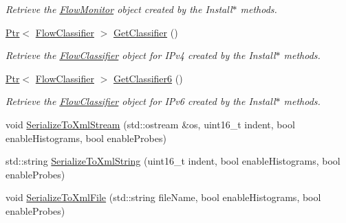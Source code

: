 \begin{DoxyCompactItemize}
\begin{DoxyCompactList}\small\item\em Retrieve the \hyperlink{classns3_1_1FlowMonitor}{Flow\+Monitor} object created by the Install$\ast$ methods. \end{DoxyCompactList}\item 
\hyperlink{classns3_1_1Ptr}{Ptr}$<$ \hyperlink{classns3_1_1FlowClassifier}{Flow\+Classifier} $>$ \hyperlink{classns3_1_1FlowMonitorHelper_a60084e694545354136fed3ce93de00ae}{Get\+Classifier} ()
\begin{DoxyCompactList}\small\item\em Retrieve the \hyperlink{classns3_1_1FlowClassifier}{Flow\+Classifier} object for I\+Pv4 created by the Install$\ast$ methods. \end{DoxyCompactList}\item 
\hyperlink{classns3_1_1Ptr}{Ptr}$<$ \hyperlink{classns3_1_1FlowClassifier}{Flow\+Classifier} $>$ \hyperlink{classns3_1_1FlowMonitorHelper_a4be2bf1ce8fc4d8e646e3bc77994f606}{Get\+Classifier6} ()
\begin{DoxyCompactList}\small\item\em Retrieve the \hyperlink{classns3_1_1FlowClassifier}{Flow\+Classifier} object for I\+Pv6 created by the Install$\ast$ methods. \end{DoxyCompactList}\item 
void \hyperlink{classns3_1_1FlowMonitorHelper_a9fe13d3552876858d3b2abc08a117f3b}{Serialize\+To\+Xml\+Stream} (std\+::ostream \&os, uint16\+\_\+t indent, bool enable\+Histograms, bool enable\+Probes)
\item 
std\+::string \hyperlink{classns3_1_1FlowMonitorHelper_a349f123606ce669102fb554fcc9dd799}{Serialize\+To\+Xml\+String} (uint16\+\_\+t indent, bool enable\+Histograms, bool enable\+Probes)
\item 
void \hyperlink{classns3_1_1FlowMonitorHelper_ad032f5b08ea5ccbb5992b5ccf56f08e8}{Serialize\+To\+Xml\+File} (std\+::string file\+Name, bool enable\+Histograms, bool enable\+Probes)
\end{DoxyCompactItemize}
